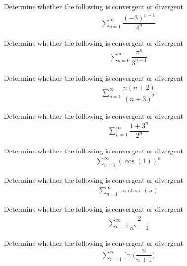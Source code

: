 \begin{exercise}
Determine whether the following is convergent or divergent
\begin{align*}
    \sum_{n=1}^{\infty} \dfrac{(-3)^{n-1}}{4^{n}}
\end{align*}
\end{exercise}

\begin{exercise}
Determine whether the following is convergent or divergent
\begin{align*}
    \sum_{n=0}^{\infty} \dfrac{\pi^{n}}{3^{n+1}}
\end{align*}
\end{exercise}

\begin{exercise}
Determine whether the following is convergent or divergent
\begin{align*}
    \sum_{n=1}^{\infty} \dfrac{n(n+2)}{(n+3)^{2}}
\end{align*}
\end{exercise}

\begin{exercise}
Determine whether the following is convergent or divergent
\begin{align*}
    \sum_{n=1}^{\infty} \dfrac{1+3^{n}}{2^{n}}
\end{align*}
\end{exercise}

\begin{exercise}
Determine whether the following is convergent or divergent
\begin{align*}
    \sum_{n=1}^{\infty} (\cos(1))^{n}
\end{align*}
\end{exercise}

\begin{exercise}
Determine whether the following is convergent or divergent
\begin{align*}
    \sum_{n=1}^{\infty} \arctan(n)
\end{align*}
\end{exercise}

\begin{exercise}
Determine whether the following is convergent or divergent
\begin{align*}
    \sum_{n=2}^{\infty} \dfrac{2}{n^{2}-1}
\end{align*}
\end{exercise}

\begin{exercise}
Determine whether the following is convergent or divergent
\begin{align*}
    \sum_{n=1}^{\infty} \ln\Big(\dfrac{n}{n+1}\Big)
\end{align*}
\end{exercise}

